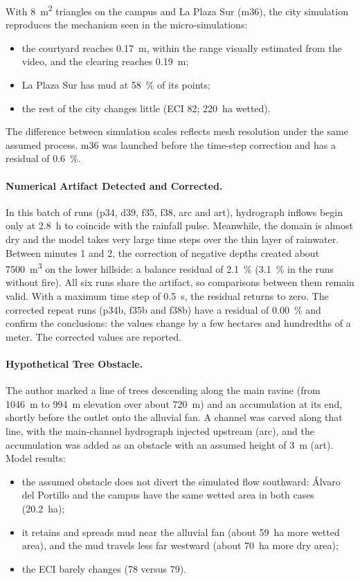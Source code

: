 With \SI{8}{m^2} triangles on the campus and La Plaza Sur (m36), the city simulation reproduces the mechanism seen in the micro-simulations:
\begin{itemize}
\item the courtyard reaches \SI{0.17}{m}, within the range visually estimated from the video, and the clearing reaches \SI{0.19}{m};
\item La Plaza Sur has mud at \SI{58}{\percent} of its points;
\item the rest of the city changes little (ECI 82; \SI{220}{ha} wetted).
\end{itemize}
The difference between simulation scales reflects mesh resolution under the same assumed process. m36 was launched before the time-step correction and has a residual of \SI[retain-explicit-plus=true]{+0.6}{\percent}.

\paragraph{Numerical Artifact Detected and Corrected.} In this batch of runs (p34, d39, f35, f38, arc and art), hydrograph inflows begin only at \SI{2.8}{h} to coincide with the rainfall pulse. Meanwhile, the domain is almost dry and the model takes very large time steps over the thin layer of rainwater. Between minutes 1 and 2, the correction of negative depths created about \SI{7500}{m^3} on the lower hillside: a balance residual of \SI[retain-explicit-plus=true]{+2.1}{\percent} (\SI[retain-explicit-plus=true]{+3.1}{\percent} in the runs without fire). All six runs share the artifact, so comparisons between them remain valid. With a maximum time step of \SI{0.5}{s}, the residual returns to zero. The corrected repeat runs (p34b, f35b and f38b) have a residual of \SI{0.00}{\percent} and confirm the conclusions: the values change by a few hectares and hundredths of a meter. The corrected values are reported.

\paragraph{Hypothetical Tree Obstacle.} The author marked a line of trees descending along the main ravine (from \SI{1046}{m} to \SI{994}{m} elevation over about \SI{720}{m}) and an accumulation at its end, shortly before the outlet onto the alluvial fan. A channel was carved along that line, with the main-channel hydrograph injected upstream (arc), and the accumulation was added as an obstacle with an assumed height of \SI{3}{m} (art). Model results:
\begin{itemize}
\item the assumed obstacle does not divert the simulated flow southward: Álvaro del Portillo and the campus have the same wetted area in both cases (\SI{20.2}{ha});
\item it retains and spreads mud near the alluvial fan (about \SI{59}{ha} more wetted area), and the mud travels less far westward (about \SI{70}{ha} more dry area);
\item the ECI barely changes (78 versus 79).
\end{itemize}

